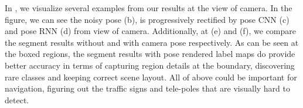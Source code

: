 In , we visualize several examples from our results at the view of camera. In the figure, we can see the noisy pose (b), is progressively rectified by pose CNN (c) and pose RNN (d) from view of camera. Additionally, at (e) and (f), we compare the segment results without and with camera pose respectively. As can be seen at the boxed regions, the segment results with pose rendered label maps do provide better accuracy in terms of capturing region details at the boundary, discovering rare classes and keeping correct scene layout. All of above could be important for navigation, \eg figuring out the traffic signs and tele-poles that are visually hard to detect.
